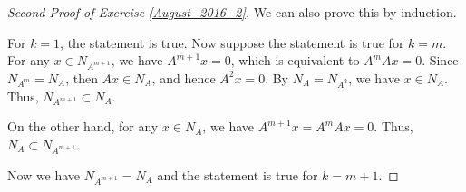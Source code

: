 \documentclass[11pt]{article}
\theoremstyle{definition}
\numberwithin{equation}{subsection}
\begin{document}
\medskip

\begin{proof}[Second Proof of Exercise \ref{August_2016_2}]
We can also prove this by induction.

For $k = 1$, the statement is true. Now suppose the statement is true for $k = m$. For any $x \in N_{A^{m+1}}$, we have $A^{m+1}x = 0$, which is equivalent to $A^m Ax = 0$. Since $N_{A^m} = N_A$, then $Ax \in N_A$, and hence $A^2x = 0$. By $N_A = N_{A^2}$, we have $x \in N_A$. Thus, $N_{A^{m+1}} \subset N_A$.

On the other hand, for any $x \in N_A$, we have $A^{m+1}x = A^m Ax = 0$. Thus, $N_A \subset N_{A^{m+1}}$.

Now we have $N_{A^{m+1}} = N_A$ and the statement is true for $k = m + 1$.
\end{proof}

\medskip
\end{document}
